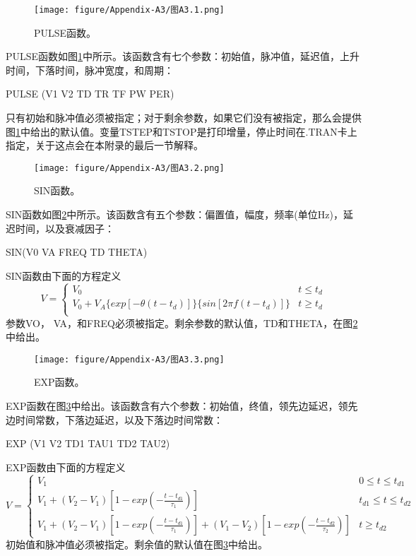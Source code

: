 \begin{figure}[htbp]
\small
    \centering
    \texttt{[image: figure/Appendix-A3/图A3.1.png]}
    \caption{PULSE函数。}
    \label{图A3.1}
\end{figure}

PULSE函数如图\ref{图A3.1}中所示。该函数含有七个参数：初始值，脉冲值，延迟值，上升时间，下落时间，脉冲宽度，和周期：

PULSE (V1 V2 TD TR TF PW PER)

只有初始和脉冲值必须被指定；对于剩余参数，如果它们没有被指定，那么会提供图\ref{图A3.1}中给出的默认值。变量TSTEP和TSTOP是打印增量，停止时间在.TRAN卡上指定，关于这点会在本附录的最后一节解释。

\begin{figure}[htbp]
\small
    \centering
    \texttt{[image: figure/Appendix-A3/图A3.2.png]}
    \caption{SIN函数。}
    \label{图A3.2}
\end{figure}

SIN函数如图\ref{图A3.2}中所示。该函数含有五个参数：偏置值，幅度，频率(单位Hz)，延迟时间，以及衰减因子：

SIN(V0 VA FREQ TD THETA)

SIN函数由下面的方程定义
\begin{equation}
    V=\left\{\begin{matrix}
V_0 & t\leq t_d  \\
V_0 + V_A\{exp[-\theta(t-t_d)]\}\{sin[2\pi f(t-t_d)]\} & t \geq t_d \\
\end{matrix}\right.
\label{eq:A3.1}
\end{equation}
参数VO， VA，和FREQ必须被指定。剩余参数的默认值，TD和THETA，在图\ref{图A3.2}中给出。

\begin{figure}[htbp]
\small
    \centering
    \texttt{[image: figure/Appendix-A3/图A3.3.png]}
    \caption{EXP函数。}
    \label{图A3.3}
\end{figure}

EXP函数在图\ref{图A3.3}中给出。该函数含有六个参数：初始值，终值，领先边延迟，领先边时间常数，下落边延迟，以及下落边时间常数：

EXP (V1 V2 TD1 TAU1 TD2 TAU2)

EXP函数由下面的方程定义
\begin{equation}
    V=
\left\{\begin{matrix}
V_1 & 0 \leq t \leq t_{d1}  \\
V_1 + (V_2 - V_1)[1-exp(-\frac{t-t_{d1}}{\tau_1})] &t_{d1} \leq t \leq t_{d2}  \\
V_1 + (V_2 - V_1)[1-exp(-\frac{t-t_{d1}}{\tau_1})] + (V_1 - V_2)[1-exp(-\frac{t-t_{d2}}{\tau_2})] & t \geq t_{d2} 
\end{matrix}\right.
\label{eq:A3.2}
\end{equation}
初始值和脉冲值必须被指定。剩余值的默认值在图\ref{图A3.3}中给出。

